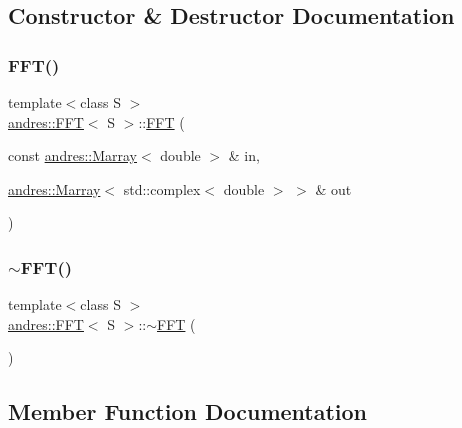 \subsection{Constructor \& Destructor Documentation}
\mbox{\label{classandres_1_1FFT_a0163fa67e3b12c454ebfd688e54f7859}} 
\subsubsection{\texorpdfstring{F\+F\+T()}{FFT()}}
{\footnotesize\ttfamily template$<$class S $>$ \\
\hyperlink{classandres_1_1FFT}{andres\+::\+F\+FT}$<$ S $>$\+::\hyperlink{classandres_1_1FFT}{F\+FT} (\begin{DoxyParamCaption}\item[{const \hyperlink{classandres_1_1Marray}{andres\+::\+Marray}$<$ double $>$ \&}]{in,  }\item[{\hyperlink{classandres_1_1Marray}{andres\+::\+Marray}$<$ std\+::complex$<$ double $>$ $>$ \&}]{out }\end{DoxyParamCaption})\hspace{0.3cm}{\ttfamily [inline]}}

\mbox{\label{classandres_1_1FFT_a11656c721a5b073be01fbdd71793ee1e}} 
\subsubsection{\texorpdfstring{$\sim$\+F\+F\+T()}{~FFT()}}
{\footnotesize\ttfamily template$<$class S $>$ \\
\hyperlink{classandres_1_1FFT}{andres\+::\+F\+FT}$<$ S $>$\+::$\sim$\hyperlink{classandres_1_1FFT}{F\+FT} (\begin{DoxyParamCaption}{ }\end{DoxyParamCaption})\hspace{0.3cm}{\ttfamily [inline]}}



\subsection{Member Function Documentation}
\mbox{\label{classandres_1_1FFT_aa73174ae3df430476d768eab0ad0e283}} 
